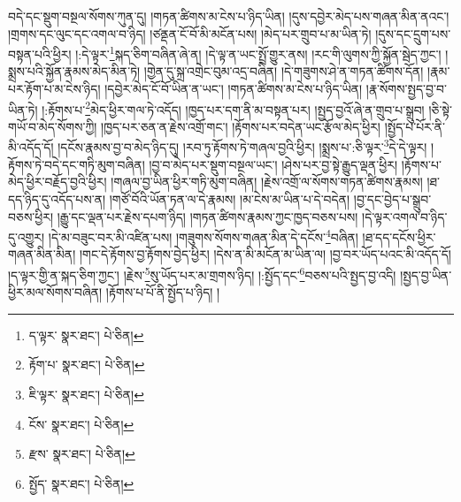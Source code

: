བདེ་དང་སྡུག་བསྔལ་སོགས་ཀུན་དུ། །གཏན་ཚིགས་མ་ངེས་པ་ཉིད་ཡིན། །དུས་དབྱེར་མེད་པས་གཞན་མིན་ནའང་། །གྲགས་དང་ལུང་དང་འགལ་བ་ཉིད། །ཙནྡན་ངོ་བོ་མི་མངོན་པས། །མེད་པར་གྲུབ་པ་མ་ཡིན་ཏེ། །དུས་དང་དྲུག་པས་བསྟན་པའི་ཕྱིར། །:དེ་ལྟར་\footnote{ད་ལྟར་  སྣར་ཐང་།  པེ་ཅིན། }སྐད་ཅིག་བཞིན་ཞེ་ན། །དེ་ལྟ་ན་ཡང་སྤྲོ་གྱུར་ནས། །རང་གི་ལུགས་ཀྱི་སྐྱོན་སྦེད་ཀྱང་། །སྨྲས་པའི་སྐྱོན་རྣམས་མེད་མིན་ཏེ། །གྱེན་དུ་སྐྲ་འགྲེང་བུམ་འདྲ་བཞིན། །དེ་གཟུགས་ཤེ་ན་གཏན་ཚིགས་དོན། །རྣམ་པར་རྟོག་པ་མ་ངེས་ཉིད། །དབྱེར་མེད་ངོ་བོ་ཡིན་ན་ཡང་། །གཏན་ཚིགས་མ་ངེས་པ་ཉིད་ཡིན། །རྣ་སོགས་སྤྱད་བྱ་བ་ཡིན་ཏེ། །:རྟོགས་པ་\footnote{རྟོག་པ་  སྣར་ཐང་།  པེ་ཅིན། }མེད་ཕྱིར་གལ་ཏེ་འདོད། །ཁྱད་པར་དག་ནི་མ་བསྟན་པར། །སྤྱད་བྱའོ་ཞེ་ན་གྲུབ་པ་སྒྲུབ། །ཅི་སྟེ་གཡོ་བ་མེད་སོགས་ཀྱི། །ཁྱད་པར་ཅན་ན་རྗེས་འགྲོ་གང་། །རྟོགས་པར་བདེན་ཡང་རྩོལ་མེད་ཕྱིར། །སྤྱོད་པ་པོར་ནི་མི་འདོད་དོ། །དངོས་རྣམས་བྱ་བ་མེད་ཉིད་དུ། །རབ་ཏུ་རྟོགས་ཏེ་གཞལ་བྱའི་ཕྱིར། །སྨྲས་པ་:ཅི་ལྟར་\footnote{ཇི་ལྟར་  སྣར་ཐང་།  པེ་ཅིན། }དེ་དེ་ལྟར། །རྟོགས་ཏེ་བདེ་དང་གཏི་མུག་བཞིན། །བྱ་བ་མེད་པར་སྡུག་བསྔལ་ཡང་། །ཤེས་པར་བྱ་སྟེ་རྒྱུད་ལྡན་ཕྱིར། །རྟོགས་པ་མེད་ཕྱིར་བརྗོད་བྱའི་ཕྱིར། །གཞལ་བྱ་ཡིན་ཕྱིར་གཏི་མུག་བཞིན། །རྗེས་འགྲོ་ལ་སོགས་གཏན་ཚིགས་རྣམས། །ཐ་དད་ཉིད་དུ་འདོད་པས་ན། །གཙོ་བོའི་ཡོན་ཏན་ལ་དེ་རྣམས། །མ་ངེས་མ་ཡིན་པ་དེ་བདེན། །བྱ་དང་བྱེད་པ་སྒྲུབ་བཅས་ཕྱིར། །རྒྱུ་དང་ལྡན་པར་རྗེས་དཔག་ཉིད། །གཏན་ཚིགས་རྣམས་ཀྱང་ཁྱད་བཅས་པས། །དེ་ལྟར་འགལ་བ་ཉིད་དུ་འགྱུར། །དེ་མ་བཟུང་བར་མི་འཛིན་པས། །གཟུགས་སོགས་གཞན་མིན་དེ་དངོས་\footnote{ངོས་  སྣར་ཐང་།  པེ་ཅིན། }བཞིན། །ཐ་དད་དངོས་ཕྱིར་གཞན་མིན་མིན། །གང་དེ་རྟོགས་བྱ་རྟོགས་བྱེད་ཕྱིར། །དེས་ན་མི་མངོན་མ་ཡིན་ལ། །བྱ་བར་ཡོད་པའང་མི་འདོད་དོ། །ད་ལྟར་གྱི་ན་སྐད་ཅིག་ཀྱང་། །རྗེས་\footnote{རྫས་  སྣར་ཐང་།  པེ་ཅིན། }སུ་ཡོད་པར་མ་གྲགས་ཉིད། །:སྤྱོད་དང་\footnote{སྤྱོད་  སྣར་ཐང་།  པེ་ཅིན། }བཅས་པའི་སྤྱད་བྱ་འདི། །སྤྱད་བྱ་ཡིན་ཕྱིར་མལ་སོགས་བཞིན། །རྟོགས་པ་པོ་ནི་སྤྱོད་པ་ཉིད། །
